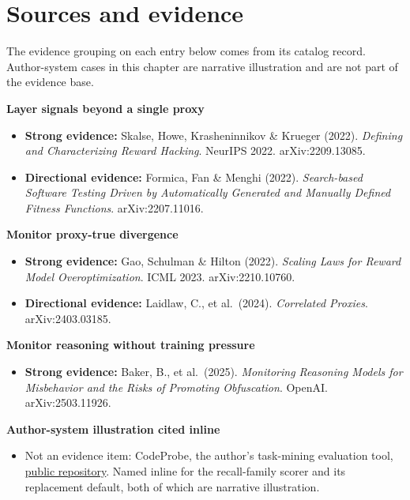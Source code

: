\section*{Sources and evidence}

The evidence grouping on each entry below comes from its catalog record. Author-system cases in this chapter are narrative illustration and are not part of the evidence base.

\textbf{Layer signals beyond a single proxy}

\begin{itemize}
\tightlist
\item
  \textbf{Strong evidence:} Skalse, Howe, Krasheninnikov \& Krueger (2022). \emph{Defining and Characterizing Reward Hacking}. NeurIPS 2022. arXiv:2209.13085.
\item
  \textbf{Directional evidence:} Formica, Fan \& Menghi (2022). \emph{Search-based Software Testing Driven by Automatically Generated and Manually Defined Fitness Functions}. arXiv:2207.11016.
\end{itemize}

\textbf{Monitor proxy-true divergence}

\begin{itemize}
\tightlist
\item
  \textbf{Strong evidence:} Gao, Schulman \& Hilton (2022). \emph{Scaling Laws for Reward Model Overoptimization}. ICML 2023. arXiv:2210.10760.
\item
  \textbf{Directional evidence:} Laidlaw, C., et al.~(2024). \emph{Correlated Proxies}. arXiv:2403.03185.
\end{itemize}

\textbf{Monitor reasoning without training pressure}

\begin{itemize}
\tightlist
\item
  \textbf{Strong evidence:} Baker, B., et al.~(2025). \emph{Monitoring Reasoning Models for Misbehavior and the Risks of Promoting Obfuscation}. OpenAI. arXiv:2503.11926.
\end{itemize}

\textbf{Author-system illustration cited inline}

\begin{itemize}
\tightlist
\item
  Not an evidence item: CodeProbe, the author's task-mining evaluation tool, \href{https://github.com/sjarmak/codeprobe}{public repository}. Named inline for the recall-family scorer and its replacement default, both of which are narrative illustration.
\end{itemize}

